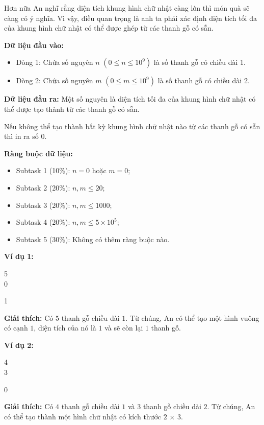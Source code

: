 \documentclass[12pt]{scrartcl}  %
\begin{document}
Hơn nữa An nghĩ rằng diện tích khung hình chữ nhật càng lớn thì món quà sẽ càng có ý nghĩa. Vì vậy, điều quan trọng là anh ta phải xác định diện tích tối đa của khung hình chữ nhật có thể được ghép từ các thanh gỗ có sẵn.

\textbf{Dữ liệu đầu vào:}
\begin{itemize}
    \item Dòng 1: Chứa số nguyên $n$ $(0 \leq n \leq 10^9)$ là số thanh gỗ có chiều dài 1.
    \item Dòng 2: Chứa số nguyên $m$ $(0 \leq m \leq 10^9)$ là số thanh gỗ có chiều dài 2.
\end{itemize}

\textbf{Dữ liệu đầu ra:}
Một số nguyên là diện tích tối đa của khung hình chữ nhật có thể được tạo thành từ các thanh gỗ có sẵn.

Nếu không thể tạo thành bất kỳ khung hình chữ nhật nào từ các thanh gỗ có sẵn thì in ra số $0$.

\textbf{Ràng buộc dữ liệu:}
\begin{itemize}
    \item Subtask 1 (10\%): $n = 0$ hoặc $m = 0$;
    \item Subtask 2 (20\%): $n, m \leq 20$;
    \item Subtask 3 (20\%): $n, m \leq 1000$;
    \item Subtask 4 (20\%): $n, m \leq 5 \times 10^5$;
    \item Subtask 5 (30\%): Không có thêm ràng buộc nào.
\end{itemize}

\textbf{Ví dụ 1:}
\begin{tcolorbox}[colback=gray!5!white, colframe=blue!50!black, title=Input]
5\\
0
\end{tcolorbox}
\begin{tcolorbox}[colback=gray!5!white, colframe=green!50!black, title=Output]
1
\end{tcolorbox}

\textbf{Giải thích:}
Có $5$ thanh gỗ chiều dài $1$. Từ chúng, An có thể tạo một hình vuông có cạnh $1$, diện tích của nó là $1$ và sẽ còn lại $1$ thanh gỗ.

\textbf{Ví dụ 2:}
\begin{tcolorbox}[colback=gray!5!white, colframe=blue!50!black, title=Input]
4\\
3
\end{tcolorbox}
\begin{tcolorbox}[colback=gray!5!white, colframe=green!50!black, title=Output]
0
\end{tcolorbox}
\textbf{Giải thích:}
Có $4$ thanh gỗ chiều dài $1$ và $3$ thanh gỗ chiều dài $2$. Từ chúng, An có thể tạo thành một hình chữ nhật có kích thước $2$ × $3$.
\end{document}
